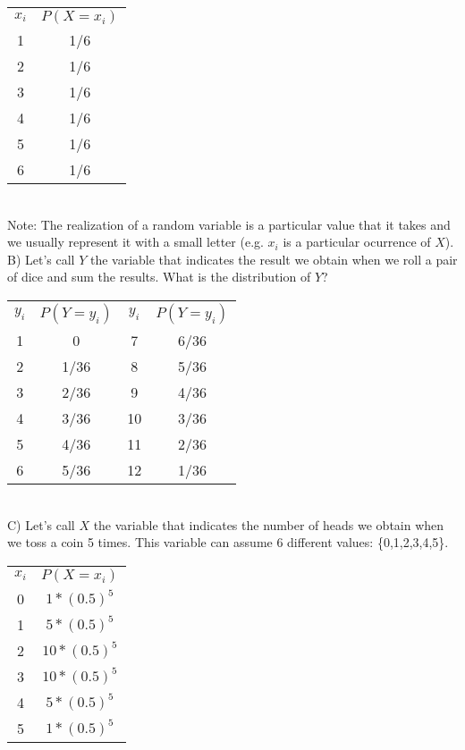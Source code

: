 \documentclass[11pt]{article}
\begin{document}
	\begin{tabular}{|c|c|}
\hline
	$x_i$ & $P(X=x_i)$\\
	\cline{1-2}
	1 & 1/6\\
	2 & 1/6\\
	3 & 1/6\\
	4 & 1/6\\
	5 & 1/6\\
	6 & 1/6\\

\hline
\end{tabular}\newline\\

Note: The realization of a random variable is a particular value that it takes and we usually represent it with a small letter (e.g. $x_i$ is a particular ocurrence of $X$).\\

	B) Let's call $Y$ the variable that indicates the result we obtain when we roll a pair of dice and sum the results. What is the distribution of $Y$?\\
	
	\begin{tabular}{|c|c|c|c|}
\hline
	$y_i$ & $P(Y=y_i)$ & $y_i$ & $P(Y=y_i)$\\
	\cline{1-4}
	1 & 0 & 7 & 6/36\\
	2 & 1/36 & 8 & 5/36\\
	3 & 2/36 & 9 & 4/36\\
	4 & 3/36 & 10 & 3/36\\
	5 & 4/36 & 11 & 2/36\\
	6 & 5/36 & 12 & 1/36\\
\hline
\end{tabular}\newline\\

	C) Let's call $X$ the variable that indicates the number of heads we obtain when we toss a coin 5 times. This variable can assume 6 different values: \{0,1,2,3,4,5\}.\\
	
	\begin{tabular}{|c|c|}
\hline
	$x_i$ & $P(X=x_i)$\\
	\cline{1-2}
	0 & $1 * (0.5)^5$\\
	1 & $5 * (0.5)^5$\\
	2 & $10 * (0.5)^5$\\
	3 & $10 * (0.5)^5$\\
	4 & $5 * (0.5)^5$\\
	5 & $1 * (0.5)^5$\\
\hline
\end{tabular}
\end{document}
